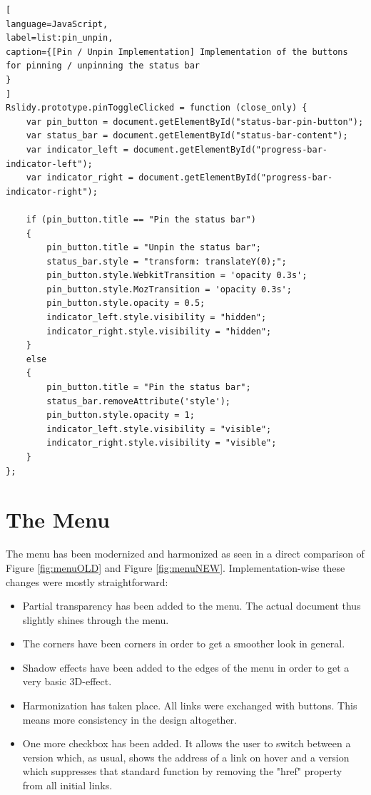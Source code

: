 \begin{minipage}{\linewidth}
\begin{lstlisting}[
language=JavaScript,
label=list:pin_unpin,
caption={[Pin / Unpin Implementation] Implementation of the buttons for pinning / unpinning the status bar 
}
]
Rslidy.prototype.pinToggleClicked = function (close_only) {
	var pin_button = document.getElementById("status-bar-pin-button");
	var status_bar = document.getElementById("status-bar-content");
	var indicator_left = document.getElementById("progress-bar-indicator-left");
	var indicator_right = document.getElementById("progress-bar-indicator-right");

	if (pin_button.title == "Pin the status bar")
	{
		pin_button.title = "Unpin the status bar";
		status_bar.style = "transform: translateY(0);";
		pin_button.style.WebkitTransition = 'opacity 0.3s';
		pin_button.style.MozTransition = 'opacity 0.3s';
		pin_button.style.opacity = 0.5;
		indicator_left.style.visibility = "hidden";
		indicator_right.style.visibility = "hidden";
	}
	else
	{			
		pin_button.title = "Pin the status bar";
		status_bar.removeAttribute('style');
		pin_button.style.opacity = 1;
		indicator_left.style.visibility = "visible";
		indicator_right.style.visibility = "visible";
	}
};
\end{lstlisting}
\end{minipage}

\section{The Menu}
The menu has been modernized and harmonized as seen in a direct comparison of Figure \ref{fig:menuOLD} and Figure \ref{fig:menuNEW}. Implementation-wise these changes were mostly straightforward:
\begin{itemize}
	\item Partial transparency has been added to the menu. The actual document thus slightly shines through the menu.
	\item The corners have been corners in order to get a smoother look in general.
	\item Shadow effects have been added to the edges of the menu in order to get a very basic 3D-effect.
	\item Harmonization has taken place. All links were exchanged with buttons. This means more consistency in the design altogether. 
	\item One more checkbox has been added. It allows the user to switch between a version which, as usual, shows the address of a link on hover and a version which suppresses that standard function by removing the "href" property from all initial links.
\end{itemize}

